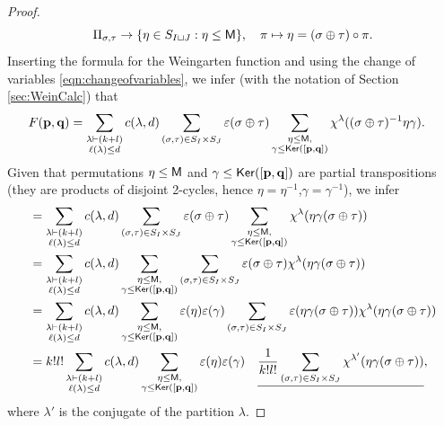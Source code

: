 \documentclass[11pt, a4paper, oneside, reqno]{amsart}
\newcommand{\copairpq}{{[{\bf p},{\bf q}]}}
\theoremstyle{remark}
\theoremstyle{definition}
\numberwithin{equation}{section}
\begin{document}
\begin{proof}
\begin{equation}
	\label{eqn:changeofvariables}
	\Pi_{\sigma,\tau} \rightarrow  \{\eta \in S_{I\sqcup J} : \eta \leq {\sf M}\}  , \quad \pi \mapsto \eta = (\sigma \oplus \tau) \circ \pi.
\end{equation}
Inserting the formula for the Weingarten function and using the change of variables \eqref{eqn:changeofvariables}, we infer (with the notation of Section \ref{sec:WeinCalc}) that
\begin{align*}
	F({\bf p}, {\bf q}) & =\sum_{\substack{\lambda \vdash (k+l) \\ \ell(\lambda) \leq d}}c(\lambda, d) \sum_{(\sigma, \tau)\in S_I \times S_J}\varepsilon(\sigma \oplus \tau)\sum_{\substack{\eta \leq {\sf M}, \\ \gamma \leq {\sf Ker}(\copairpq)}}\chi^{\lambda}((\sigma \oplus \tau)^{-1} \eta \gamma).
\end{align*}
Given that permutations $\eta \leq {\sf M}$ and $\gamma \leq {\sf Ker}(\copairpq)$ are partial transpositions (they are products of disjoint 2-cycles, hence $\eta = \eta^{-1}$,$\gamma = \gamma^{-1}$), we infer
\begin{align}
 & = \sum_{\substack{\lambda \vdash (k+l)     \\ \ell(\lambda) \leq d}}c({\lambda},d) \sum_{(\sigma, \tau)\in S_I \times S_J}\varepsilon(\sigma \oplus \tau)\sum_{\substack{\eta \leq {\sf M}, \\\gamma \leq {\sf Ker}(\copairpq)}}\chi^{\lambda}(\eta \gamma (\sigma \oplus \tau) ) \notag \\
 & = \sum_{\substack{\lambda \vdash (k+l)     \\ \ell(\lambda) \leq d}}c({\lambda},d) \sum_{\substack{\eta \leq {\sf M}, \\\gamma \leq {\sf Ker}(\copairpq)}} \sum_{(\sigma, \tau)\in S_I \times S_J}\varepsilon(\sigma \oplus \tau)\chi^{\lambda}(\eta \gamma (\sigma \oplus \tau) ) \notag \\
 & =\sum_{\substack{\lambda \vdash (k+l)      \\ \ell(\lambda) \leq d}}c({\lambda},d) \sum_{\substack{\eta \leq {\sf M}, \\\gamma \leq {\sf Ker}(\copairpq)}} \varepsilon(\eta)\varepsilon(\gamma)\sum_{(\sigma, \tau)\in S_I \times S_J}\varepsilon(\eta \gamma (\sigma \oplus \tau))\chi^{\lambda}(\eta \gamma (\sigma \oplus \tau) ) \notag \\
 & = k!l!\sum_{\substack{\lambda \vdash (k+l) \\ \ell(\lambda) \leq d}}c({\lambda},d) \sum_{\substack{\eta \leq {\sf M}, \\\gamma \leq {\sf Ker}(\copairpq)}} \varepsilon(\eta)\varepsilon(\gamma)\quad \underline{\frac{1}{k!l!}\sum_{(\sigma, \tau)\in S_I \times S_J}\chi^{\lambda'}(\eta \gamma (\sigma \oplus \tau) )}, \label{eqn:SpherFuncFpq}
\end{align}
where $\lambda'$ is the conjugate of the partition $\lambda$.



\end{proof}
\end{document}
